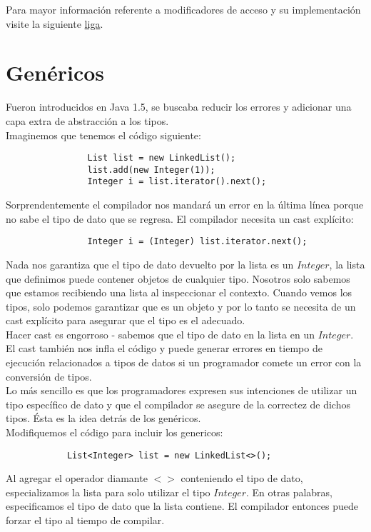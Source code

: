 \documentclass[12pt,article,oneside]{memoir}
\begin{document}
			Para mayor informaci\'on referente a modificadores de acceso y su implementaci\'on visite la siguiente 
			\href{https://www.simplilearn.com/tutorials/java-tutorial/access-modifiers#what_are_access_modifiers_in_java}{liga}.			
		\section{Gen\'ericos}
		Fueron introducidos en Java 1.5, se buscaba reducir los errores y adicionar una capa extra de abstracci\'on 
		a los tipos.\\
		
		Imaginemos que tenemos el c\'odigo siguiente:
			\begin{verbatim}
				List list = new LinkedList();
				list.add(new Integer(1)); 
				Integer i = list.iterator().next();
			\end{verbatim}
		
		Sorprendentemente el compilador nos mandar\'a un error en la \'ultima l\'inea porque no sabe el tipo de dato que 
		se regresa. El compilador necesita un cast expl\'icito:
			\begin{verbatim}
				Integer i = (Integer) list.iterator.next();
			\end{verbatim}
		
		Nada nos garantiza que el tipo de dato devuelto por la lista es un $Integer$, la lista que definimos puede contener 
		objetos de cualquier tipo. Nosotros solo sabemos que estamos recibiendo una lista al inspeccionar el contexto. Cuando 
		vemos los tipos, solo podemos garantizar que es un objeto y por lo tanto se necesita de un cast expl\'icito para 
		asegurar que el tipo es el adecuado.\\
		
		Hacer cast es engorroso - sabemos que el tipo de dato en la lista en un $Integer$. El cast tambi\'en nos infla 
		el c\'odigo y puede generar errores en tiempo de ejecuci\'on relacionados a tipos de datos si un programador 
		comete un error con la conversi\'on de tipos.\\
		
		Lo m\'as sencillo es que los programadores expresen sus intenciones de utilizar un tipo espec\'ifico de dato y que el 
		compilador se asegure de la correctez de dichos tipos. \'Esta es la idea detr\'as de los gen\'ericos.\\
		
		Modifiquemos el c\'odigo para incluir los genericos:
			\begin{verbatim}
			List<Integer> list = new LinkedList<>();
			\end{verbatim}
		Al agregar el operador diamante $<>$ conteniendo el tipo de dato, especializamos la lista para solo utilizar el tipo 
		$Integer$. En otras palabras, especificamos el tipo de dato que la lista contiene. El compilador entonces puede 
		forzar el tipo al tiempo de compilar.\\
		
\end{document}
